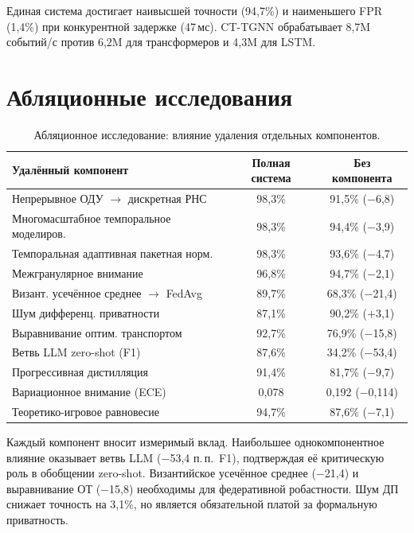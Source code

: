 Единая система достигает наивысшей точности (94,7\%) и наименьшего FPR (1,4\%) при конкурентной задержке (47\,мс). CT-TGNN обрабатывает 8,7M событий/с против 6,2M для трансформеров и 4,3M для LSTM.


\section{Абляционные исследования}
\label{sec:ablation}

\begin{table}[htbp]
\centering
\caption{Абляционное исследование: влияние удаления отдельных компонентов.}
\label{tab:ablation}
\begin{tabular}{lcc}
\toprule
Удалённый компонент & Полная система & Без компонента \\
\midrule
Непрерывное ОДУ $\to$ дискретная РНС & 98,3\% & 91,5\% ($-$6,8) \\
Многомасштабное темпоральное моделиров.  & 98,3\% & 94,4\% ($-$3,9) \\
Темпоральная адаптивная пакетная норм.   & 98,3\% & 93,6\% ($-$4,7) \\
Межгранулярное внимание                  & 96,8\% & 94,7\% ($-$2,1) \\
Визант. усечённое среднее $\to$ FedAvg   & 89,7\% & 68,3\% ($-$21,4) \\
Шум дифференц. приватности               & 87,1\% & 90,2\% (+3,1) \\
Выравнивание оптим. транспортом           & 92,7\% & 76,9\% ($-$15,8) \\
Ветвь LLM zero-shot (F1)                & 87,6\% & 34,2\% ($-$53,4) \\
Прогрессивная дистилляция                & 91,4\% & 81,7\% ($-$9,7) \\
Вариационное внимание (ECE)              & 0,078  & 0,192 ($-$0,114) \\
Теоретико-игровое равновесие              & 94,7\% & 87,6\% ($-$7,1) \\
\bottomrule
\end{tabular}
\end{table}

Каждый компонент вносит измеримый вклад. Наибольшее однокомпонентное влияние оказывает ветвь LLM ($-$53,4 п.\,п.\ F1), подтверждая её критическую роль в обобщении zero-shot. Византийское усечённое среднее ($-$21,4) и выравнивание ОТ ($-$15,8) необходимы для федеративной робастности. Шум ДП снижает точность на 3,1\%, но является обязательной платой за формальную приватность.


